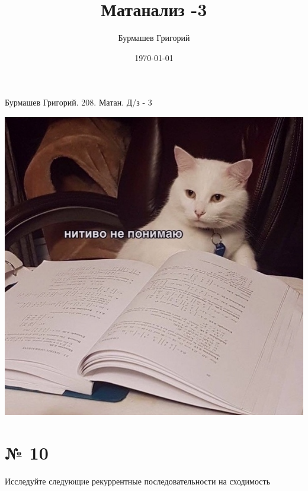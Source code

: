 \documentclass[a4paper,12pt]{article}
\author{Бурмашев Григорий}
\title{Матанализ  -3}
\date{\today}
\begin{document}
\begin{center}
Бурмашев Григорий.  208. Матан. Д/з - 3 
\begin{center}
\includegraphics[scale=0.3]{cat.jpg}
\end{center}
\end{center}
\newpage
\section*{№ 10}
Исследуйте следующие рекуррентные последовательности на сходимость
\end{document}
